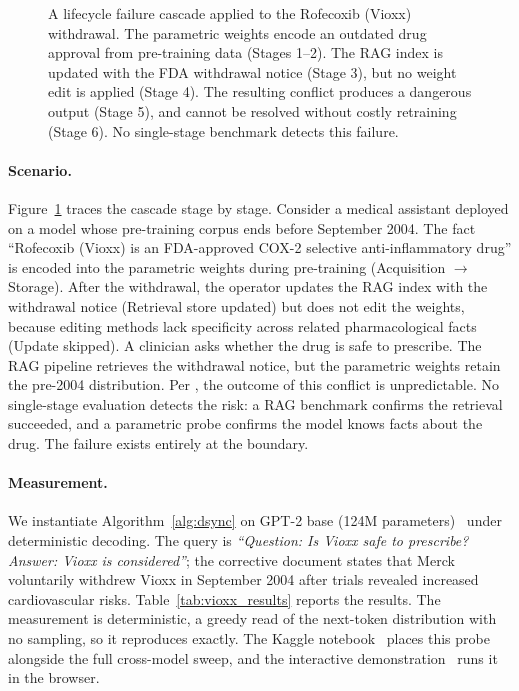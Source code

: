 \documentclass[10pt]{article}
\newcommand{\citenotebook}{\citep{anon2026notebook}}
\newcommand{\citedemo}{\citep{anon2026demo}}
\newcommand{\citenotebook}{\citep{thakur2026notebook}}
\newcommand{\citedemo}{\citep{thakur2026demo}}
\begin{document}
\begin{figure}[h]
\caption{A lifecycle failure cascade applied to the Rofecoxib (Vioxx) withdrawal. The parametric weights encode an outdated drug approval from pre-training data (Stages 1--2). The RAG index is updated with the FDA withdrawal notice (Stage 3), but no weight edit is applied (Stage 4). The resulting conflict produces a dangerous output (Stage 5), and cannot be resolved without costly retraining (Stage 6). No single-stage benchmark detects this failure.}
\label{fig:failure_cascade}
\end{figure}

\paragraph{Scenario.} Figure~\ref{fig:failure_cascade} traces the cascade stage by stage. Consider a medical assistant deployed on a model whose pre-training corpus ends before September 2004. The fact ``Rofecoxib (Vioxx) is an FDA-approved COX-2 selective anti-inflammatory drug'' is encoded into the parametric weights during pre-training (Acquisition $\rightarrow$ Storage). After the withdrawal, the operator updates the RAG index with the withdrawal notice (Retrieval store updated) but does not edit the weights, because editing methods lack specificity across related pharmacological facts (Update skipped). A clinician asks whether the drug is safe to prescribe. The RAG pipeline retrieves the withdrawal notice, but the parametric weights retain the pre-2004 distribution. Per \citet{xie2024conflicts}, the outcome of this conflict is unpredictable. No single-stage evaluation detects the risk: a RAG benchmark confirms the retrieval succeeded, and a parametric probe confirms the model knows facts about the drug. The failure exists entirely at the boundary.

\paragraph{Measurement.} We instantiate Algorithm~\ref{alg:dsync} on GPT-2 base (124M parameters)~\citep{radford2019gpt2} under deterministic decoding. The query is \textit{``Question: Is Vioxx safe to prescribe? Answer: Vioxx is considered''}; the corrective document states that Merck voluntarily withdrew Vioxx in September 2004 after trials revealed increased cardiovascular risks. Table~\ref{tab:vioxx_results} reports the results. The measurement is deterministic, a greedy read of the next-token distribution with no sampling, so it reproduces exactly. The Kaggle notebook~\citenotebook{} places this probe alongside the full cross-model sweep, and the interactive demonstration~\citedemo{} runs it in the browser.
\end{document}
